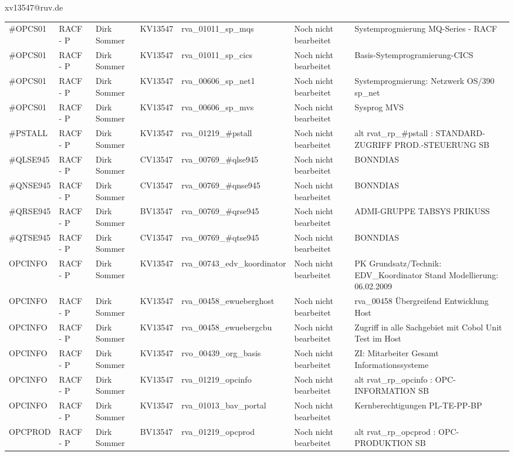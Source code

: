 \documentclass[a4paper,landscape,12pt]{letter}
\begin{document}
\begin{letter}{xv13547@ruv.de\hfill \break}
\begin{tiny}
\begin{longtable}{|p{35mm}|p{15mm}|p{25mm}|p{10mm}|p{40mm}|p{50mm}|p{50mm}|}
\#OPCS01 & RACF - P & Dirk Sommer & KV13547 & rva\_01011\_sp\_mqs & Noch nicht bearbeitet & Systemprogmierung MQ-Series - RACF \\
\#OPCS01 & RACF - P & Dirk Sommer & KV13547 & rva\_01011\_sp\_cics & Noch nicht bearbeitet & Basis-Sytemprogramierung-CICS \\
\#OPCS01 & RACF - P & Dirk Sommer & KV13547 & rva\_00606\_sp\_net1 & Noch nicht bearbeitet & Systemprogmierung: Netzwerk OS/390 sp\_net \\
\#OPCS01 & RACF - P & Dirk Sommer & KV13547 & rva\_00606\_sp\_mvs & Noch nicht bearbeitet & Sysprog MVS \\
\#PSTALL & RACF - P & Dirk Sommer & KV13547 & rva\_01219\_\#pstall & Noch nicht bearbeitet & alt rvat\_rp\_\#pstall          : STANDARD-ZUGRIFF PROD.-STEUERUNG SB \\
\#QLSE945 & RACF - P & Dirk Sommer & CV13547 & rva\_00769\_\#qlse945 & Noch nicht bearbeitet & BONNDIAS \\
\#QNSE945 & RACF - P & Dirk Sommer & CV13547 & rva\_00769\_\#qnse945 & Noch nicht bearbeitet & BONNDIAS \\
\#QRSE945 & RACF - P & Dirk Sommer & BV13547 & rva\_00769\_\#qrse945 & Noch nicht bearbeitet & ADMI-GRUPPE TABSYS PRIKUSS \\
\#QTSE945 & RACF - P & Dirk Sommer & CV13547 & rva\_00769\_\#qtse945 & Noch nicht bearbeitet & BONNDIAS \\
OPCINFO & RACF - P & Dirk Sommer & KV13547 & rva\_00743\_edv\_koordinator & Noch nicht bearbeitet & PK Grundsatz/Technik: EDV\_Koordinator Stand Modellierung: 06.02.2009 \\
OPCINFO & RACF - P & Dirk Sommer & KV13547 & rva\_00458\_ewueberghost & Noch nicht bearbeitet & rva\_00458 Übergreifend Entwicklung Host \\
OPCINFO & RACF - P & Dirk Sommer & KV13547 & rva\_00458\_ewuebergcbu & Noch nicht bearbeitet & Zugriff in alle Sachgebiet mit Cobol Unit Test im Host \\
OPCINFO & RACF - P & Dirk Sommer & KV13547 & rvo\_00439\_org\_basis & Noch nicht bearbeitet & ZI: Mitarbeiter Gesamt Informationssysteme \\
OPCINFO & RACF - P & Dirk Sommer & KV13547 & rva\_01219\_opcinfo & Noch nicht bearbeitet & alt rvat\_rp\_opcinfo          : OPC- INFORMATION                         SB \\
OPCINFO & RACF - P & Dirk Sommer & KV13547 & rva\_01013\_bav\_portal & Noch nicht bearbeitet & Kernberechtigungen PL-TE-PP-BP \\
OPCPROD & RACF - P & Dirk Sommer & BV13547 & rva\_01219\_opcprod & Noch nicht bearbeitet & alt rvat\_rp\_opcprod          : OPC-PRODUKTION                           SB \\


\end{longtable}
\end{tiny}
\end{letter}
\end{document}
